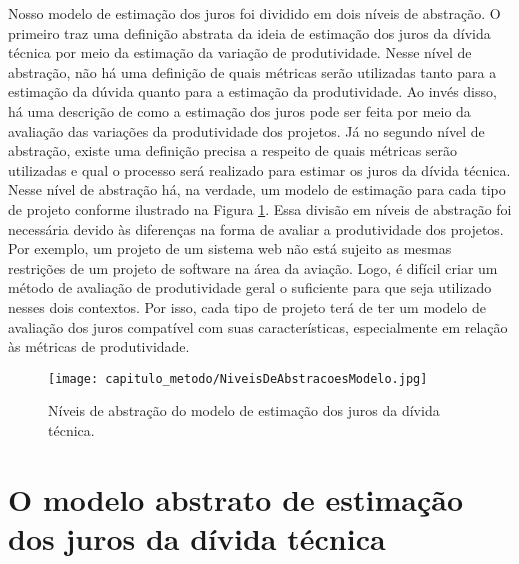 Nosso modelo de estimação dos juros foi dividido em dois níveis de abstração. O primeiro traz uma definição abstrata da ideia de estimação dos juros da dívida técnica por meio da estimação da variação de produtividade. Nesse nível de abstração, não há uma definição de quais métricas serão utilizadas tanto para a estimação da dúvida quanto para a estimação da produtividade. Ao invés disso, há uma descrição de como a estimação dos juros pode ser feita por meio da avaliação das variações da produtividade dos projetos. Já no segundo nível de abstração, existe uma definição precisa a respeito de quais métricas serão utilizadas e qual o processo será realizado para estimar os juros da dívida técnica. Nesse nível de abstração há, na verdade, um modelo de estimação para cada tipo de projeto conforme ilustrado na Figura \ref{fig:cap_metodo_niveis_abstracao}. Essa divisão em níveis de abstração foi necessária devido às diferenças na forma de avaliar a produtividade dos projetos. Por exemplo, um projeto de um sistema web não está sujeito as mesmas restrições de um projeto de software na área da aviação. Logo, é difícil criar um método de avaliação de produtividade geral o suficiente para que seja utilizado nesses dois contextos. Por isso, cada tipo de projeto terá de ter um modelo de avaliação dos juros compatível com suas características, especialmente em relação às métricas de produtividade.

  \begin{figure}[H]
  \centering
  \texttt{[image: capitulo\_metodo/NiveisDeAbstracoesModelo.jpg]} 
  \caption{Níveis de abstração do modelo de estimação dos juros da dívida técnica. }
  \label{fig:cap_metodo_niveis_abstracao} 
\end{figure}




\section{O modelo abstrato de estimação dos juros da dívida técnica}
\label{modelo_abstrato}



